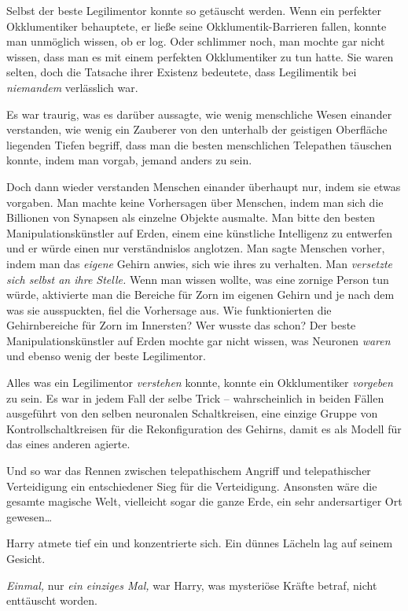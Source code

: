{Selbst der beste Legilimentor konnte so getäuscht werden. Wenn ein perfekter Okklumentiker behauptete, er ließe seine Okklumentik-Barrieren fallen, konnte man unmöglich wissen, ob er log. Oder schlimmer noch, man mochte gar nicht wissen, dass man es mit einem perfekten Okklumentiker zu tun hatte. Sie waren selten, doch die Tatsache ihrer Existenz bedeutete, dass Legilimentik bei \emph{niemandem} verlässlich war.

Es war traurig, was es darüber aussagte, wie wenig menschliche Wesen einander verstanden, wie wenig ein Zauberer von den unterhalb der geistigen Oberfläche liegenden Tiefen begriff, dass man die besten menschlichen Telepathen täuschen konnte, indem man vorgab, jemand anders zu sein.

Doch dann wieder verstanden Menschen einander überhaupt nur, indem sie etwas vorgaben. Man machte keine Vorhersagen über Menschen, indem man sich die Billionen von Synapsen als einzelne Objekte ausmalte. Man bitte den besten Manipulationskünstler auf Erden, einem eine künstliche Intelligenz zu entwerfen und er würde einen nur verständnislos anglotzen. Man sagte Menschen vorher, indem man das \emph{eigene} Gehirn anwies, sich wie ihres zu verhalten. Man \emph{versetzte sich selbst an ihre Stelle.} Wenn man wissen wollte, was eine zornige Person tun würde, aktivierte man die Bereiche für Zorn im eigenen Gehirn und je nach dem was sie ausspuckten, fiel die Vorhersage aus. Wie funktionierten die Gehirnbereiche für Zorn im Innersten? Wer wusste das schon? Der beste Manipulationskünstler auf Erden mochte gar nicht wissen, was Neuronen \emph{waren} und ebenso wenig der beste Legilimentor.

Alles was ein Legilimentor \emph{verstehen} konnte, konnte ein Okklumentiker \emph{vorgeben} zu sein. Es war in jedem Fall der selbe Trick -- wahrscheinlich in beiden Fällen ausgeführt von den selben neuronalen Schaltkreisen, eine einzige Gruppe von Kontrollschaltkreisen für die Rekonfiguration des Gehirns, damit es als Modell für das eines anderen agierte.

Und so war das Rennen zwischen telepathischem Angriff und telepathischer Verteidigung ein entschiedener Sieg für die Verteidigung. Ansonsten wäre die gesamte magische Welt, vielleicht sogar die ganze Erde, ein sehr andersartiger Ort gewesen…

Harry atmete tief ein und konzentrierte sich. Ein dünnes Lächeln lag auf seinem Gesicht.

\emph{Einmal,} nur \emph{ein einziges Mal,} war Harry, was mysteriöse Kräfte betraf, nicht enttäuscht worden.

}
